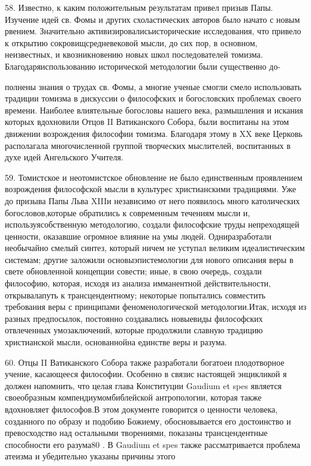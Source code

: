 \documentclass[a5paper,10pt]{article}
\begin{document}
58. Известно, к каким положительным результатам привел призыв Папы. Изучение
идей св. Фомы и других схоластических авторов было начато с новым рвением.
Значительно активизировалисьисторические исследования, что привело к открытию
сокровищсредневековой мысли, до сих пор, в основном, неизвестных, и
квозникновению новых школ последователей томизма. Благодаряиспользованию
исторической методологии были существенно до-

полнены знания о трудах св. Фомы, а многие ученые смогли смело использовать
традиции томизма в дискуссии о философских и богословских проблемах своего
времени. Наиболее влиятельные богословы нашего века, размышления и искания
которых вдохновили Отцов II Ватиканского Собора, были воспитаны на этом
движении возрождения философии томизма. Благодаря этому в XX веке Церковь
располагала многочисленной группой творческих мыслителей, воспитанных в духе
идей Ангельского Учителя.

59. Томистское и неотомистское обновление не было единственным проявлением
возрождения философской мысли в культурес христианскими традициями. Уже до
призыва Папы Льва XIIIи независимо от него появилось много католических
богословов,которые обратились к современным течениям мысли и,
используясобственную методологию, создали философские труды непреходящей
ценности, оказавшие огромное влияние на умы людей. Одниразработали необычайно
смелый синтез, который ничем не уступал великим идеалистическим системам;
другие заложили основыэпистемологии для нового описания веры в свете
обновленной концепции совести; иные, в свою очередь, создали философию,
которая, исходя из анализа имманентной действительности, открывалапуть к
трансцендентному; некоторые попытались совместить требования веры с принципами
феноменологической методологии.Итак, исходя из разных предпосылок, постоянно
создавались новыевиды философских отвлеченных умозаключений, которые продолжили
славную традицию христианской мысли, основаннойна единстве веры и разума.

60. Отцы II Ватиканского Собора также разработали богатоеи плодотворное учение,
касающееся философии. Особенно в связис настоящей энцикликой я должен
напомнить, что целая глава Конституции Gaudium et spes является своеобразным
компендиумомбиблейской антропологии, которая также вдохновляет философов.В этом
документе говорится о ценности человека, созданного по образу и подобию
Божиему, обосновывается его достоинство и превосходство над остальными
творениями, показаны трансцендентные способности его разума80 . В Gaudium et
spes также рассматривается проблема атеизма и убедительно указаны причины этого
\end{document}

